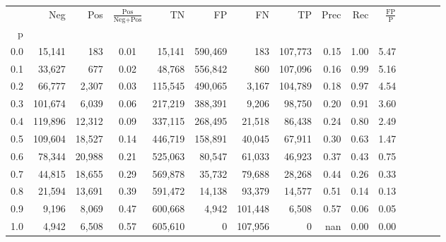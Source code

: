 \begin{tabular}{rrrcrrrrrrrrrrr}
\toprule
{} &      Neg &     Pos & $\frac{\text{Pos}}{\text{Neg}+\text{Pos}}$ &       TN &       FP &       FN &       TP &  Prec &   Rec & $\frac{\text{FP}}{\text{P}}$ \\
p   &          &         &                                            &          &          &          &          &       &       &                              \\
\midrule
0.0 &   15,141 &     183 &                                       0.01 &   15,141 &  590,469 &      183 &  107,773 &  0.15 &  1.00 &                         5.47 \\
0.1 &   33,627 &     677 &                                       0.02 &   48,768 &  556,842 &      860 &  107,096 &  0.16 &  0.99 &                         5.16 \\
0.2 &   66,777 &   2,307 &                                       0.03 &  115,545 &  490,065 &    3,167 &  104,789 &  0.18 &  0.97 &                         4.54 \\
0.3 &  101,674 &   6,039 &                                       0.06 &  217,219 &  388,391 &    9,206 &   98,750 &  0.20 &  0.91 &                         3.60 \\
0.4 &  119,896 &  12,312 &                                       0.09 &  337,115 &  268,495 &   21,518 &   86,438 &  0.24 &  0.80 &                         2.49 \\
0.5 &  109,604 &  18,527 &                                       0.14 &  446,719 &  158,891 &   40,045 &   67,911 &  0.30 &  0.63 &                         1.47 \\
0.6 &   78,344 &  20,988 &                                       0.21 &  525,063 &   80,547 &   61,033 &   46,923 &  0.37 &  0.43 &                         0.75 \\
0.7 &   44,815 &  18,655 &                                       0.29 &  569,878 &   35,732 &   79,688 &   28,268 &  0.44 &  0.26 &                         0.33 \\
0.8 &   21,594 &  13,691 &                                       0.39 &  591,472 &   14,138 &   93,379 &   14,577 &  0.51 &  0.14 &                         0.13 \\
0.9 &    9,196 &   8,069 &                                       0.47 &  600,668 &    4,942 &  101,448 &    6,508 &  0.57 &  0.06 &                         0.05 \\
1.0 &    4,942 &   6,508 &                                       0.57 &  605,610 &        0 &  107,956 &        0 &   nan &  0.00 &                         0.00 \\
\bottomrule
\end{tabular}

